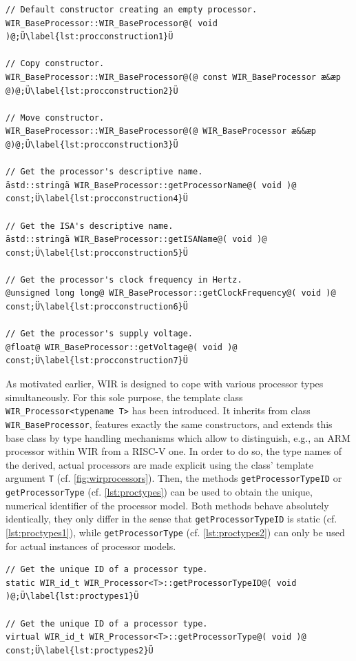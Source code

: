 \begin{lstlisting}[style=code,float=h,caption={Constructors and Methods for General Attribute Handling of Class \texttt{WIR\_BaseProcessor}},label=lst:procconstruction]
// Default constructor creating an empty processor.
WIR_BaseProcessor::WIR_BaseProcessor@( void )@;Ü\label{lst:procconstruction1}Ü

// Copy constructor.
WIR_BaseProcessor::WIR_BaseProcessor@(@ const WIR_BaseProcessor æ&æp @)@;Ü\label{lst:procconstruction2}Ü

// Move constructor.
WIR_BaseProcessor::WIR_BaseProcessor@(@ WIR_BaseProcessor æ&&æp @)@;Ü\label{lst:procconstruction3}Ü

// Get the processor's descriptive name.
ästd::stringä WIR_BaseProcessor::getProcessorName@( void )@ const;Ü\label{lst:procconstruction4}Ü

// Get the ISA's descriptive name.
ästd::stringä WIR_BaseProcessor::getISAName@( void )@ const;Ü\label{lst:procconstruction5}Ü

// Get the processor's clock frequency in Hertz.
@unsigned long long@ WIR_BaseProcessor::getClockFrequency@( void )@ const;Ü\label{lst:procconstruction6}Ü

// Get the processor's supply voltage.
@float@ WIR_BaseProcessor::getVoltage@( void )@ const;Ü\label{lst:procconstruction7}Ü
\end{lstlisting}

As motivated earlier, \gls{WIR} is designed to cope with various processor types simultaneously.
For this sole purpose, the template class \texttt{WIR\_Processor<typename T>} has been introduced.
It inherits from class \texttt{WIR\_BasePro\-cessor}, features exactly the same constructors, and extends this base class by type handling mechanisms which allow to distinguish, e.g., an ARM processor within \gls{WIR} from a RISC-V one.
In order to do so, the type names of the derived, actual processors are made explicit using the class' template argument \texttt{T} (cf. \cref{fig:wirprocessors}).
Then, the methods \texttt{getProcessorTypeID} or \texttt{getProcessorType} (cf. \cref{lst:proctypes}) can be used to obtain the unique, numerical identifier of the processor model.
Both methods behave absolutely identically, they only differ in the sense that \texttt{getProcessorTypeID} is static (cf. \cref{lst:proctypes1}), while \texttt{getProcessorType} (cf. \cref{lst:proctypes2}) can only be used for actual instances of processor models.

\begin{lstlisting}[style=code,float=t,caption={Methods for Type Handling of Class \texttt{WIR\_Processor}},label=lst:proctypes]
// Get the unique ID of a processor type.
static WIR_id_t WIR_Processor<T>::getProcessorTypeID@( void )@;Ü\label{lst:proctypes1}Ü

// Get the unique ID of a processor type.
virtual WIR_id_t WIR_Processor<T>::getProcessorType@( void )@ const;Ü\label{lst:proctypes2}Ü
\end{lstlisting}


